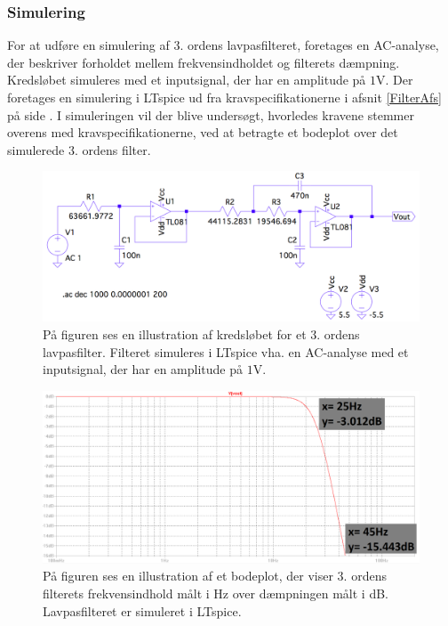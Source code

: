 \subsubsection{Simulering}
For at udføre en simulering af 3. ordens lavpasfilteret, foretages en AC-analyse, der beskriver forholdet mellem frekvensindholdet og filterets dæmpning. Kredsløbet simuleres med et inputsignal, der har en amplitude på $1$V. Der foretages en simulering i LTspice ud fra kravspecifikationerne i afsnit \ref{FilterAfs} på side \pageref{FilterAfs}. I simuleringen vil der blive undersøgt, hvorledes kravene stemmer overens med kravspecifikationerne, ved at betragte et bodeplot over det simulerede 3. ordens filter.
\begin{figure}[H]
	\centering
	\includegraphics[scale=0.35]{figures/cProblemloesning/Lavpasfilter_LTspice.PNG}
	\caption{På figuren ses en illustration af kredsløbet for et 3. ordens lavpasfilter. Filteret simuleres i LTspice vha. en AC-analyse med et inputsignal, der har en amplitude på $1$V.}
	\label{fig:lavpasfilter_LTspice}
\end{figure}
\begin{figure}[H]
	\centering
	\includegraphics[scale=0.38]{figures/cProblemloesning/Lavpasfiltergraf_LTspice2.PNG}
	\caption{På figuren ses en illustration af et bodeplot, der viser 3. ordens filterets frekvensindhold målt i Hz over dæmpningen målt i dB. Lavpasfilteret er simuleret i LTspice.}
	\label{fig:lavpasfiltergraf_LTspice1}
\end{figure}
